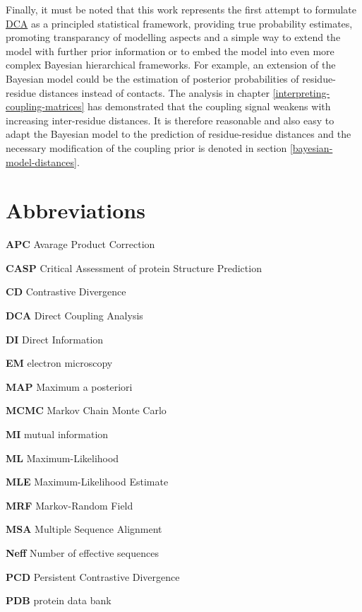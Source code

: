 \documentclass[11pt,a4paper,twoside]{book}
\theoremstyle{definition}
\theoremstyle{definition}
\theoremstyle{remark}
\begin{document}
Finally, it must be noted that this work represents the first attempt to
formulate \protect\hyperlink{abbrev}{DCA} as a principled statistical
framework, providing true probability estimates, promoting transparancy
of modelling aspects and a simple way to extend the model with further
prior information or to embed the model into even more complex Bayesian
hierarchical frameworks. For example, an extension of the Bayesian model
could be the estimation of posterior probabilities of residue-residue
distances instead of contacts. The analysis in chapter
\ref{interpreting-coupling-matrices} has demonstrated that the coupling
signal weakens with increasing inter-residue distances. It is therefore
reasonable and also easy to adapt the Bayesian model to the prediction
of residue-residue distances and the necessary modification of the
coupling prior is denoted in section \ref{bayesian-model-distances}.

\appendix


{}

\hypertarget{abbrev}{\chapter{Abbreviations}\label{abbrev}}

\textbf{APC} Avarage Product Correction

\textbf{CASP} Critical Assessment of protein Structure Prediction

\textbf{CD} Contrastive Divergence

\textbf{DCA} Direct Coupling Analysis

\textbf{DI} Direct Information

\textbf{EM} electron microscopy

\textbf{MAP} Maximum a posteriori

\textbf{MCMC} Markov Chain Monte Carlo

\textbf{MI} mutual information

\textbf{ML} Maximum-Likelihood

\textbf{MLE} Maximum-Likelihood Estimate

\textbf{MRF} Markov-Random Field

\textbf{MSA} Multiple Sequence Alignment

\textbf{Neff} Number of effective sequences

\textbf{PCD} Persistent Contrastive Divergence

\textbf{PDB} protein data bank
\end{document}
